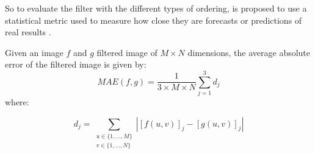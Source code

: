 


So to evaluate the filter with the different types of ordering, is proposed to use a statistical metric used to measure how close they are forecasts or predictions of real results \cite{willmott2005advantages}.

Given an image $f$ and $g$ filtered image of $M \times N$ dimensions, the average absolute error of the filtered image is given by:
\begin{equation}
\label{MAE}
MAE(f,g) = \frac{1}{3\times M\times N}\sum_{j=1}^3 d_j
\end{equation} where: 


\begin{equation}
d_j = \sum_{\substack{u\in \{1, ..., M\}\\ v \in \{1, ..., N\}}} |[f(u,v)]_{j} - [g(u,v)]_{j}| 
\end{equation}


